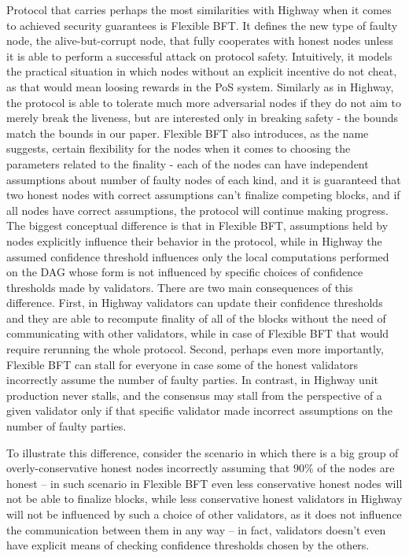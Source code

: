 \documentclass[12pt, fleqn]{article}
\begin{document}
Protocol that carries perhaps the most similarities with Highway when it comes to achieved security guarantees is Flexible BFT\cite{MNR19}.
It defines the new type of faulty node, the alive-but-corrupt node, that fully cooperates with honest nodes unless it is able to perform a successful attack on protocol safety.
Intuitively, it models the practical situation in which nodes without an explicit incentive do not cheat, as that would mean loosing rewards in the PoS system. 
Similarly as in Highway, the protocol is able to tolerate much more adversarial nodes if they do not aim to merely break the liveness, but are interested only in breaking safety - the bounds match the bounds in our paper. 
Flexible BFT also introduces, as the name suggests, certain flexibility for the nodes when it comes to choosing the parameters related to the finality - each of the nodes can have independent assumptions about number of faulty nodes of each kind, and it is guaranteed that two honest nodes with correct assumptions can't finalize competing blocks, and if all nodes have correct assumptions, the protocol will continue making progress.
The biggest conceptual difference is that in Flexible BFT, assumptions held by nodes explicitly influence their behavior in the protocol, while in Highway the assumed confidence threshold influences only the local computations performed on the DAG whose form is not influenced by specific choices of confidence thresholds made by validators. 
There are two main consequences of this difference. First, in Highway validators can update their confidence thresholds and they are able to recompute finality of all of the blocks without the need of communicating with other validators, while in case of Flexible BFT that would require rerunning the whole protocol. 
Second, perhaps even more importantly, Flexible BFT can stall for everyone in case some of the honest validators incorrectly assume the number of faulty parties.
In contrast, in Highway unit production never stalls, and the consensus may stall from the perspective of a given validator only if that specific validator made incorrect assumptions on the number of faulty parties.

To illustrate this difference, consider the scenario in which there is a big group of overly-conservative honest nodes incorrectly assuming that $90\%$ of the nodes are honest -- in such scenario in Flexible BFT even less conservative honest nodes will not be able to finalize blocks, while less conservative honest validators in Highway will not be influenced by such a choice of other validators, as it does not influence the communication between them in any way -- in fact, validators doesn't even have explicit means of checking confidence thresholds chosen by the others. 
\end{document}
